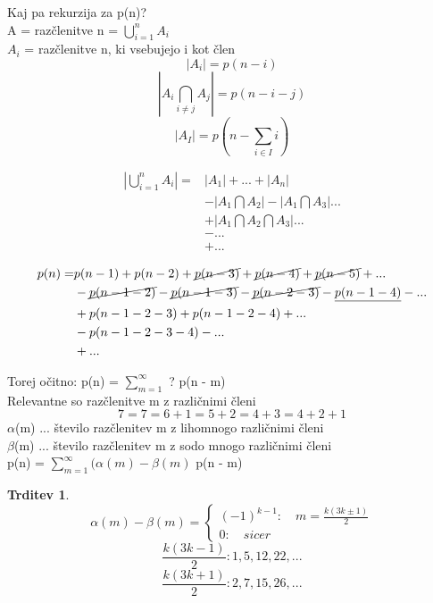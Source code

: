 \documentclass[a4paper,12pt]{article}
\theoremstyle{definition}
\newtheorem{claim}[counter]{Trditev}
\theoremstyle{remark}
\begin{document}
Kaj pa rekurzija za p(n)?\\
A = {razčlenitve n} = $\displaystyle \bigcup_{i = 1}^n A_i$\\
$A_i$ = {razčlenitve n, ki vsebujejo i kot člen}\\
\[|A_i| = p(n - i)\]
\[|A_i \bigcap_{i \neq j} A_j| = p(n - i - j)\]
\[|A_I| = p(n - \sum_{i \in I} i)\]

\begin{align}
	|\bigcup_{i = 1}^n A_i| = & |A_1| + ... + |A_n|\nonumber\\
    			& - |A_1 \bigcap A_2| - |A_1 \bigcap A_3| ...\nonumber\\
                & + |A_1 \bigcap A_2 \bigcap A_3| ...\nonumber\\
                & - ...\nonumber\\
                & + ...\nonumber
\end{align}

\begin{align}
	p(n) = & p(n - 1) + p(n - 2) + \cancel{p(n - 3)} + \cancel{p(n - 4)} + \cancel{p(n - 5)} + ...\nonumber\\
    	& - \cancel{p(n - 1 - 2)} - \cancel{p(n - 1 - 3)} - \cancel{p(n - 2 - 3)} - \underline{p(n - 1 - 4)} - ...\nonumber\\
        & + p(n - 1 - 2 - 3) + p(n - 1 - 2 - 4) + ...\nonumber\\
        & - p(n - 1 - 2 - 3 - 4) - ...\nonumber\\
        & + ...\nonumber
\end{align}

Torej očitno: p(n) = $\displaystyle\sum_{m=1}^{\infty}$ ? p(n - m)\\
Relevantne so razčlenitve m z različnimi členi
\[7 = 7 = 6 + 1 = 5 + 2 = 4 + 3 = 4 + 2 + 1\]
$\alpha$(m) ... število razčlenitev m z lihomnogo različnimi členi\\
$\beta$(m) ... število razčlenitev m z sodo mnogo različnimi členi\\
p(n) = $\sum_{m = 1}^{\infty} (\alpha(m) - \beta (m)$ p(n - m)

\begin{claim}
\[\alpha(m) - \beta(m) = \begin{cases}(-1)^{k - 1}: \quad m = \frac{k (3k \pm 1)}{2}  \\ 0: \quad sicer \end{cases}\]
\[\frac{k (3k - 1)}{2}: 1, 5, 12, 22, ...\]
\[\frac{k (3k + 1)}{2}: 2, 7, 15, 26, ...\]
\end{claim}
\end{document}
